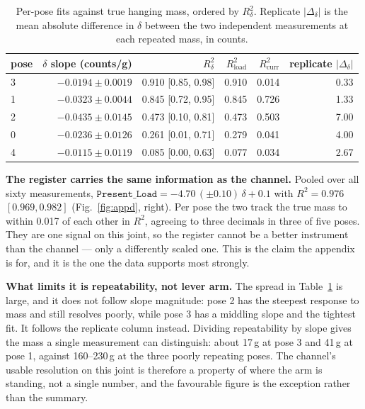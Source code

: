 \documentclass{article}
\begin{document}
\begin{table}[h]
\centering
\small
\begin{tabular}{lrrrrr}
\toprule
pose & $\delta$ slope (counts/g) & $R^2_\delta$ & $R^2_{\mathrm{load}}$ & $R^2_{\mathrm{curr}}$ & replicate $|\Delta_\delta|$ \\
\midrule
3 & $-0.0194 \pm 0.0019$ & 0.910 [0.85, 0.98] & 0.910 & 0.014 & 0.33 \\
1 & $-0.0323 \pm 0.0044$ & 0.845 [0.72, 0.95] & 0.845 & 0.726 & 1.33 \\
2 & $-0.0435 \pm 0.0145$ & 0.473 [0.10, 0.81] & 0.473 & 0.503 & 7.00 \\
0 & $-0.0236 \pm 0.0126$ & 0.261 [0.01, 0.71] & 0.279 & 0.041 & 4.00 \\
4 & $-0.0115 \pm 0.0119$ & 0.085 [0.00, 0.63] & 0.077 & 0.034 & 2.67 \\
\bottomrule
\end{tabular}
\caption{Per-pose fits against true hanging mass, ordered by $R^2_\delta$.
Replicate $|\Delta_\delta|$ is the mean absolute difference in $\delta$
between the two independent measurements at each repeated mass, in counts.}
\label{tab:appd}
\end{table}

\textbf{The register carries the same information as the channel.}
Pooled over all sixty measurements,
$\texttt{Present\_Load} = -4.70\,(\pm 0.10)\,\delta + 0.1$ with
$R^2 = 0.976$ $[0.969, 0.982]$ (Fig.~\ref{fig:appd}, right). Per pose the
two track the true mass to within 0.017 of each other in $R^2$, agreeing to
three decimals in three of five poses. They are one signal on this joint, so
the register cannot be a better instrument than the channel --- only a
differently scaled one. This is the claim the appendix is for, and it is
the one the data supports most strongly.

\textbf{What limits it is repeatability, not lever arm.} The spread in
Table~\ref{tab:appd} is large, and it does not follow slope magnitude: pose
2 has the steepest response to mass and still resolves poorly, while pose 3
has a middling slope and the tightest fit. It follows the replicate column
instead. Dividing repeatability by slope gives the mass a single
measurement can distinguish: about 17\,g at pose 3 and 41\,g at pose 1,
against 160--230\,g at the three poorly repeating poses. The channel's
usable resolution on this joint is therefore a property of where the arm is
standing, not a single number, and the favourable figure is the exception
rather than the summary.
\end{document}
